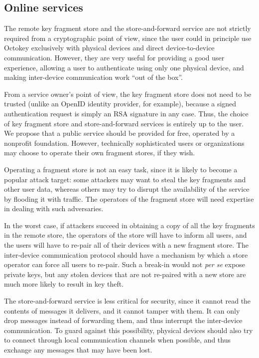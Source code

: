 \subsection{Online services}\label{sec:store-security}

The remote key fragment store and the store-and-forward service are not strictly required from a
cryptographic point of view, since the user could in principle use Octokey exclusively with physical
devices and direct device-to-device communication. However, they are very useful for providing a
good user experience, allowing a user to authenticate using only one physical device, and making
inter-device communication work ``out of the box''.

From a service owner's point of view, the key fragment store does not need to be trusted (unlike an
OpenID identity provider, for example), because a signed authentication request is simply an RSA
signature in any case. Thus, the choice of key fragment store and store-and-forward services is
entirely up to the user. We propose that a public service should be provided for free, operated by a
nonprofit foundation. However, technically sophisticated users or organizations may choose to
operate their own fragment stores, if they wish.

Operating a fragment store is not an easy task, since it is likely to become a popular attack
target: some attackers may want to steal the key fragments and other user data, whereas others may
try to disrupt the availability of the service by flooding it with traffic. The operators of the
fragment store will need expertise in dealing with such adversaries.

In the worst case, if attackers succeed in obtaining a copy of all the key fragments in the remote
store, the operators of the store will have to inform all users, and the users will have to re-pair
all of their devices with a new fragment store. The inter-device communication protocol should have
a mechanism by which a store operator can force all users to re-pair. Such a break-in would not
\emph{per se} expose private keys, but any stolen devices that are not re-paired with a new store
are much more likely to result in key theft.

The store-and-forward service is less critical for security, since it cannot read the contents of
messages it delivers, and it cannot tamper with them. It can only drop messages instead of
forwarding them, and thus interrupt the inter-device communication. To guard against this
possibility, physical devices should also try to connect through local communication channels when
possible, and thus exchange any messages that may have been lost.

